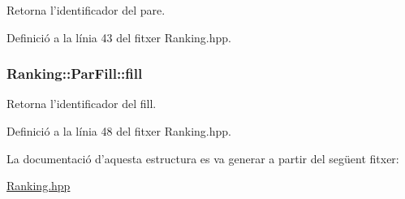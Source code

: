 Retorna l'identificador del pare. 



Definició a la línia 43 del fitxer Ranking.\-hpp.

\hypertarget{struct_ranking_1_1_par_fill_a3b20e448cd957e593268c84368529b05}{
\subsubsection[{fill}]{\setlength{\rightskip}{0pt plus 5cm}Ranking\-::\-Par\-Fill\-::fill}}\label{struct_ranking_1_1_par_fill_a3b20e448cd957e593268c84368529b05}


Retorna l'identificador del fill. 



Definició a la línia 48 del fitxer Ranking.\-hpp.



La documentació d'aquesta estructura es va generar a partir del següent fitxer\-:\begin{DoxyCompactItemize}
\item 
\hyperlink{_ranking_8hpp}{Ranking.\-hpp}\end{DoxyCompactItemize}
